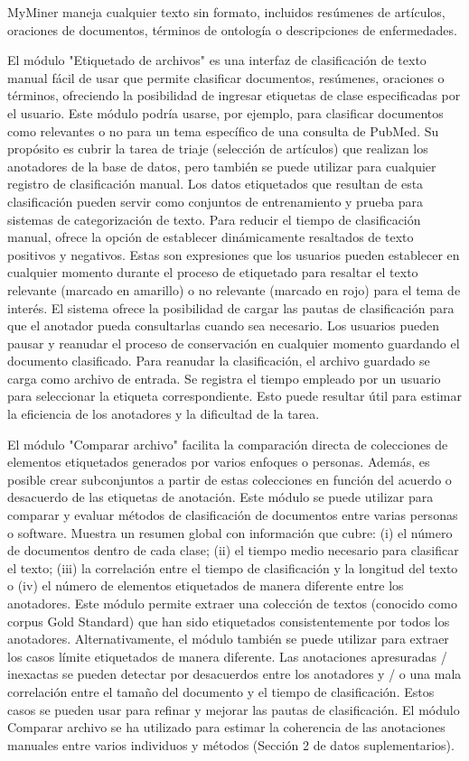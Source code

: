 \begin{description}
MyMiner maneja cualquier texto sin formato, incluidos resúmenes de artículos, oraciones de documentos, términos de ontología o descripciones de enfermedades.

El módulo "Etiquetado de archivos" es una interfaz de clasificación de texto manual fácil de usar que permite clasificar documentos, resúmenes, oraciones o términos, ofreciendo la posibilidad de ingresar etiquetas de clase especificadas por el usuario. Este módulo podría usarse, por ejemplo, para clasificar documentos como relevantes o no para un tema específico de una consulta de PubMed. Su propósito es cubrir la tarea de triaje (selección de artículos) que realizan los anotadores de la base de datos, pero también se puede utilizar para cualquier registro de clasificación manual. Los datos etiquetados que resultan de esta clasificación pueden servir como conjuntos de entrenamiento y prueba para sistemas de categorización de texto. Para reducir el tiempo de clasificación manual, ofrece la opción de establecer dinámicamente resaltados de texto positivos y negativos. Estas son expresiones que los usuarios pueden establecer en cualquier momento durante el proceso de etiquetado para resaltar el texto relevante (marcado en amarillo) o no relevante (marcado en rojo) para el tema de interés. El sistema ofrece la posibilidad de cargar las pautas de clasificación para que el anotador pueda consultarlas cuando sea necesario. Los usuarios pueden pausar y reanudar el proceso de conservación en cualquier momento guardando el documento clasificado. Para reanudar la clasificación, el archivo guardado se carga como archivo de entrada. Se registra el tiempo empleado por un usuario para seleccionar la etiqueta correspondiente. Esto puede resultar útil para estimar la eficiencia de los anotadores y la dificultad de la tarea.

El módulo "Comparar archivo" facilita la comparación directa de colecciones de elementos etiquetados generados por varios enfoques o personas. Además, es posible crear subconjuntos a partir de estas colecciones en función del acuerdo o desacuerdo de las etiquetas de anotación. Este módulo se puede utilizar para comparar y evaluar métodos de clasificación de documentos entre varias personas o software. Muestra un resumen global con información que cubre: (i) el número de documentos dentro de cada clase; (ii) el tiempo medio necesario para clasificar el texto; (iii) la correlación entre el tiempo de clasificación y la longitud del texto o (iv) el número de elementos etiquetados de manera diferente entre los anotadores. Este módulo permite extraer una colección de textos (conocido como corpus Gold Standard) que han sido etiquetados consistentemente por todos los anotadores. Alternativamente, el módulo también se puede utilizar para extraer los casos límite etiquetados de manera diferente. Las anotaciones apresuradas / inexactas se pueden detectar por desacuerdos entre los anotadores y / o una mala correlación entre el tamaño del documento y el tiempo de clasificación. Estos casos se pueden usar para refinar y mejorar las pautas de clasificación. El módulo Comparar archivo se ha utilizado para estimar la coherencia de las anotaciones manuales entre varios individuos y métodos (Sección 2 de datos suplementarios).


\end{description}
